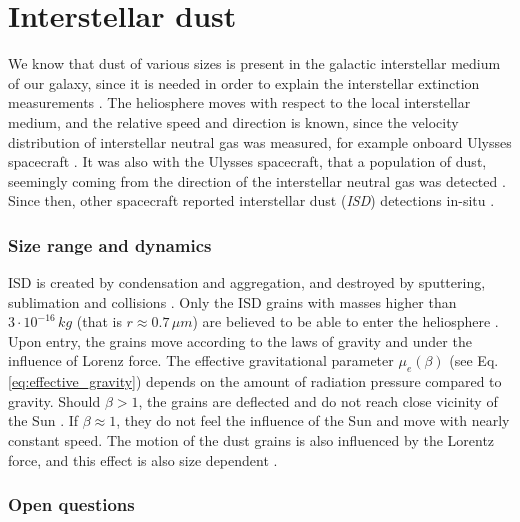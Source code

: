 \section{Interstellar dust}

We know that dust of various sizes is present in the galactic interstellar medium of our galaxy, since it is needed in order to explain the interstellar extinction measurements \citep{desert1990interstellar}. The heliosphere moves with respect to the local interstellar medium, and the relative speed and direction is known, since the velocity distribution of interstellar neutral gas was measured, for example onboard Ulysses spacecraft \citep{witte2004kinetic}. It was also with the Ulysses spacecraft, that a population of dust, seemingly coming from the direction of the interstellar neutral gas was detected \citep{grun1993discovery}. Since then, other spacecraft reported interstellar dust (\textit{ISD}) detections in-situ \citep{zaslavsky2012interplanetary,malaspina2014interplanetary}. 

\subsubsection{Size range and dynamics}

ISD is created by condensation and aggregation, and destroyed by sputtering, sublimation and collisions \citep{mann2010interstellar}. Only the ISD grains with masses higher than $3\cdot 10^{-16} \, \si{kg}$ (that is $r \approx 0.7 \, \si{\mu m} $) are believed to be able to enter the heliosphere \citep{kimura1998electric}. Upon entry, the grains move according to the laws of gravity and under the influence of Lorenz force. The effective gravitational parameter $\mu_e(\beta)$ (see Eq. \ref{eq:effective_gravity}) depends on the amount of radiation pressure compared to gravity. Should $\beta > 1$, the grains are deflected and do not reach close vicinity of the Sun \citep{henriksen2022interstellar}. If $\beta \approx 1$, they do not feel the influence of the Sun and move with nearly constant speed. The motion of the dust grains is also influenced by the Lorentz force, and this effect is also size dependent \cite{morfill1979motion}.

\subsubsection{Open questions}

